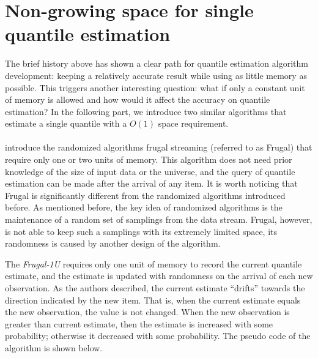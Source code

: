 

\pagebreak


\section{Non-growing space for single quantile estimation}
\label{singlequantile}
The brief history above has shown a clear path for quantile estimation algorithm development: keeping a relatively accurate result while using as little memory as possible. This triggers another interesting question: what if only a constant unit of memory is allowed and how would it affect the accuracy on quantile estimation? In the following part, we introduce two similar algorithms that estimate a single quantile with a $O(1)$ space requirement.
\\\\
\citeauthor{maFrugalStreamingEstimating2014}\cite{maFrugalStreamingEstimating2014} introduce the randomized algorithms frugal streaming (referred to as Frugal) that require only one or two units of memory. This algorithm does not need prior knowledge of the size of input data or the universe, and the query of quantile estimation can be made after the arrival of any item.
It is worth noticing that Frugal is significantly different from the randomized algorithms introduced before.
As mentioned before, the key idea of randomized algorithms is the maintenance of a random set of samplings from the data stream. Frugal, however, is not able to keep such a samplings with its extremely limited space, its randomness is caused by another design of the algorithm.

The \textit{Frugal-1U} requires only one unit of memory to record the current quantile estimate, and the estimate is updated with randomness on the arrival of each new observation. As the authors described, the current estimate ``drifts'' towards the direction indicated by the new item\cite{maFrugalStreamingEstimating2014}. That is, when the current estimate equals the new observation, the value is not changed. When the new observation is greater than current estimate, then the estimate is increased with some probability; otherwise it decreased with some probability.
The pseudo code of the algorithm is shown below.

